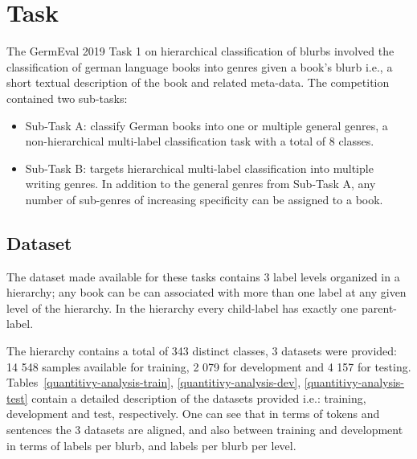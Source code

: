 \documentclass[11pt,a4paper]{article}
\begin{document}
\section{Task}\label{task}

The GermEval 2019 Task 1 on hierarchical classification of blurbs involved the
classification of german language books into genres given a book's blurb i.e., a
short textual description of the book and related meta-data. The competition
contained two sub-tasks:

\begin{itemize}

\item Sub-Task A: classify German books into one or multiple general
genres, a non-hierarchical multi-label classification task with a total of 8 classes.

\item Sub-Task B: targets hierarchical multi-label classification into multiple
writing genres. In addition to the general genres from Sub-Task A, any number of
sub-genres of increasing specificity can be assigned to a book.

\end{itemize}


\subsection{Dataset}

The dataset made available for these tasks contains 3 label levels organized in a hierarchy;
any book can be can associated with more than one label at any given level of the hierarchy.
In the hierarchy every child-label has exactly one parent-label.

The hierarchy contains a total of 343 distinct classes, 3 datasets were
provided: 14 548 samples available for training, 2 079 for development and
4 157 for testing. Tables~\ref{quantitivy-analysis-train}, \ref{quantitivy-analysis-dev},
\ref{quantitivy-analysis-test}  contain a detailed description of
the datasets provided i.e.: training, development and test, respectively. One can
see that in terms of tokens and sentences the 3 datasets are aligned, and also
between training and development in terms of labels per blurb, and labels per blurb
per level.
\end{document}

